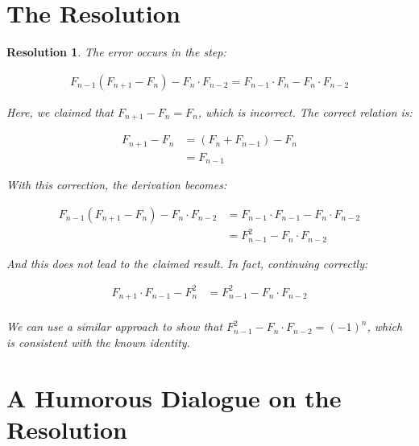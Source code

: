 \documentclass{article}
\newtheorem{resolution}{Resolution}
\begin{document}
\section{The Resolution}

\begin{resolution}
    The error occurs in the step:
    
    \begin{align}
        F_{n-1}(F_{n+1} - F_n) - F_n \cdot F_{n-2} = F_{n-1} \cdot F_n - F_n \cdot F_{n-2}
    \end{align}
    
    Here, we claimed that $F_{n+1} - F_n = F_n$, which is incorrect. The correct relation is:
    
    \begin{align}
        F_{n+1} - F_n &= (F_n + F_{n-1}) - F_n\\
        &= F_{n-1}
    \end{align}
    
    With this correction, the derivation becomes:
    
    \begin{align}
        F_{n-1}(F_{n+1} - F_n) - F_n \cdot F_{n-2} &= F_{n-1} \cdot F_{n-1} - F_n \cdot F_{n-2}\\
        &= F_{n-1}^2 - F_n \cdot F_{n-2}
    \end{align}
    
    And this does not lead to the claimed result. In fact, continuing correctly:
    
    \begin{align}
        F_{n+1} \cdot F_{n-1} - F_n^2 &= F_{n-1}^2 - F_n \cdot F_{n-2}\\
    \end{align}
    
    We can use a similar approach to show that $F_{n-1}^2 - F_n \cdot F_{n-2} = (-1)^n$, which is consistent with the known identity.
\end{resolution}

\section{A Humorous Dialogue on the Resolution}
\end{document}
